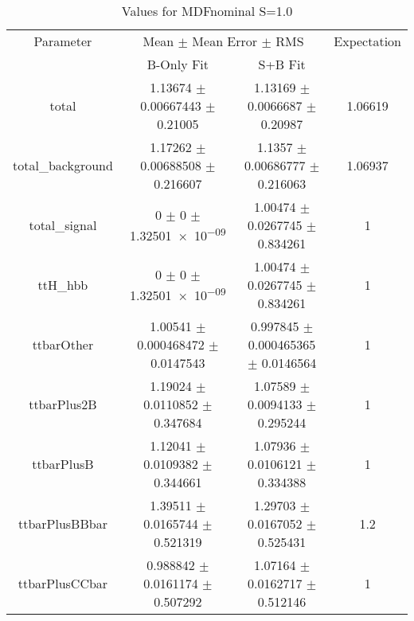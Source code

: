 \begin{table}
\centering
\caption{Values for MDFnominal S=1.0}
\begin{tabular}{cccc}
\toprule
Parameter & \multicolumn{2}{c}{Mean $\pm$ Mean Error $\pm$ RMS} & Expectation\\
 & B-Only Fit & S+B Fit & \\
\midrule
total & \num{1.13674} $\pm$ \num{0.00667443} $\pm$ \num{0.21005} & \num{1.13169} $\pm$ \num{0.0066687} $\pm$ \num{0.20987} & \num{1.06619}\\
total\_background & \num{1.17262} $\pm$ \num{0.00688508} $\pm$ \num{0.216607} & \num{1.1357} $\pm$ \num{0.00686777} $\pm$ \num{0.216063} & \num{1.06937}\\
total\_signal & \num{0} $\pm$ \num{0} $\pm$ \num{1.32501e-09} & \num{1.00474} $\pm$ \num{0.0267745} $\pm$ \num{0.834261} & \num{1}\\
ttH\_hbb & \num{0} $\pm$ \num{0} $\pm$ \num{1.32501e-09} & \num{1.00474} $\pm$ \num{0.0267745} $\pm$ \num{0.834261} & \num{1}\\
ttbarOther & \num{1.00541} $\pm$ \num{0.000468472} $\pm$ \num{0.0147543} & \num{0.997845} $\pm$ \num{0.000465365} $\pm$ \num{0.0146564} & \num{1}\\
ttbarPlus2B & \num{1.19024} $\pm$ \num{0.0110852} $\pm$ \num{0.347684} & \num{1.07589} $\pm$ \num{0.0094133} $\pm$ \num{0.295244} & \num{1}\\
ttbarPlusB & \num{1.12041} $\pm$ \num{0.0109382} $\pm$ \num{0.344661} & \num{1.07936} $\pm$ \num{0.0106121} $\pm$ \num{0.334388} & \num{1}\\
ttbarPlusBBbar & \num{1.39511} $\pm$ \num{0.0165744} $\pm$ \num{0.521319} & \num{1.29703} $\pm$ \num{0.0167052} $\pm$ \num{0.525431} & \num{1.2}\\
ttbarPlusCCbar & \num{0.988842} $\pm$ \num{0.0161174} $\pm$ \num{0.507292} & \num{1.07164} $\pm$ \num{0.0162717} $\pm$ \num{0.512146} & \num{1}\\
\bottomrule
\end{tabular}
\end{table}